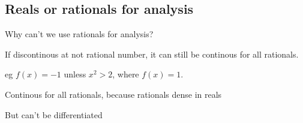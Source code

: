 
\subsection{Reals or rationals for analysis}

Why can't we use rationals for analysis?

If discontinous at not rational number, it can still be continous for all rationals.

eg \(f(x)=-1\) unless \(x^2>2\), where \(f(x)=1\).

Continous for all rationals, because rationals dense in reals

But can't be differentiated


